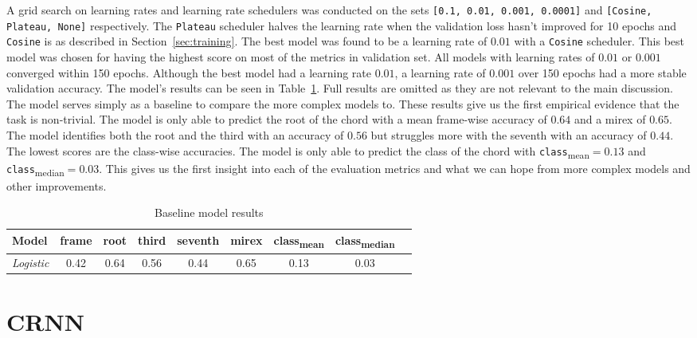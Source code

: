 A grid search on learning rates and learning rate schedulers was conducted on the sets \texttt{[0.1, 0.01, 0.001, 0.0001]} and \texttt{[Cosine, Plateau, None]} respectively. The \texttt{Plateau} scheduler halves the learning rate when the validation loss hasn't improved for 10 epochs and \texttt{Cosine} is as described in Section~\ref{sec:training}. The best model was found to be a learning rate of $0.01$ with a \texttt{Cosine} scheduler. This best model was chosen for having the highest score on most of the metrics in validation set. All models with learning rates of $0.01$ or $0.001$ converged within 150 epochs. Although the best model had a learning rate $0.01$, a learning rate of $0.001$ over 150 epochs had a more stable validation accuracy. The model's results can be seen in Table~\ref{tab:baseline_results}. Full results are omitted as they are not relevant to the main discussion. The model serves simply as a baseline to compare the more complex models to. These results give us the first empirical evidence that the task is non-trivial. The model is only able to predict the root of the chord with a mean frame-wise accuracy of $0.64$ and a mirex of $0.65$. The model identifies both the root and the third with an accuracy of $0.56$ but struggles more with the seventh with an accuracy of $0.44$. The lowest scores are the class-wise accuracies. The model is only able to predict the class of the chord with \texttt{class}\textsubscript{mean}$=0.13$ and \texttt{class}\textsubscript{median}$=0.03$. This gives us the first insight into each of the evaluation metrics and what we can hope from more complex models and other improvements.

\begin{table}[H]
    \centering
    \begin{tabular}{lcccccccc}
        \toprule
        Model & frame & root & third & seventh & mirex & class\textsubscript{mean} & class\textsubscript{median} \\  
        \midrule
        \emph{Logistic} & 0.42 & 0.64 & 0.56 & 0.44 & 0.65 & 0.13 & 0.03 \\
        \bottomrule
    \end{tabular}
    \caption{Baseline model results}\label{tab:baseline_results}
\end{table}

\section{CRNN}

